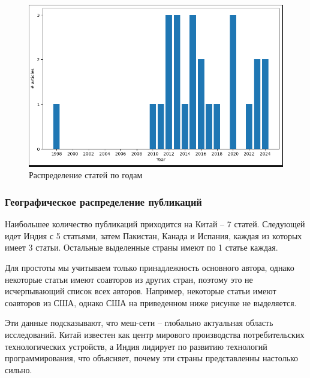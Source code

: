 \documentclass[%
]{report}
\begin{document}
\begin{figure}
\centering
\includegraphics[width=0.8\pagewidth]{./assets/by-year.png}
\caption{Распределение статей по годам}
\end{figure}

\subsubsection{Географическое распределение публикаций}\label{geographical-distribution-of-publications}

Наибольшее количество публикаций приходится на Китай -- 7 статей.
Следующей идет Индия с 5 статьями,
затем Пакистан, Канада и Испания,
каждая из которых имеет 3 статьи.
Остальные выделенные страны имеют по 1 статье каждая.

Для простоты мы учитываем только принадлежность
основного автора, однако некоторые статьи
имеют соавторов из других стран,
поэтому это не исчерпывающий список всех авторов.
Например, некоторые статьи имеют соавторов из США,
однако США на приведенном ниже рисунке не выделяется.

Эти данные подсказывают, что
меш-сети -- глобально актуальная область исследований.
Китай известен как центр мирового производства
потребительских технологических устройств,
а Индия лидирует по развитию технологий программирования,
что объясняет, почему эти страны представленны настолько сильно.
\end{document}
